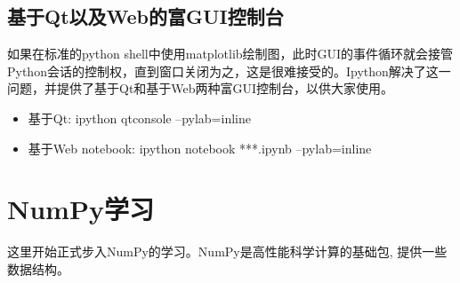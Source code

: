 \documentclass[UTF8]{ctexart}
\begin{document}
\subsection{基于Qt以及Web的富GUI控制台}
\label{sec:qtwebgui}

如果在标准的python shell中使用matplotlib绘制图，此时GUI的事件循环就会接管Python会话的控制权，直到窗口关闭为之，这是很难接受的。Ipython解决了这一问题，并提供了基于Qt和基于Web两种富GUI控制台，以供大家使用。
\begin{itemize}
\item 基于Qt: ipython qtconsole --pylab=inline
\item 基于Web notebook: ipython notebook ***.ipynb --pylab=inline
\end{itemize}

\section{NumPy学习}
\label{sec:numpy}

这里开始正式步入NumPy的学习。NumPy是高性能科学计算的基础包, 提供一些数据结构。
\end{document}
